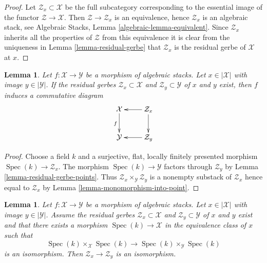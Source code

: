 \documentclass{stacks-project}
\theoremstyle{plain}
\newtheorem{lemma}[subsection]{Lemma}
\theoremstyle{definition}
\theoremstyle{remark}
\numberwithin{equation}{subsection}
\def\Spec{\mathop{\mathrm{Spec}}}
\begin{document}
\begin{proof}
Let $\mathcal{Z}_x \subset \mathcal{X}$ be the full subcategory corresponding
to the essential image of the functor $\mathcal{Z} \to \mathcal{X}$.
Then $\mathcal{Z} \to \mathcal{Z}_x$ is an equivalence, hence
$\mathcal{Z}_x$ is an algebraic stack, see
Algebraic Stacks, Lemma \ref{algebraic-lemma-equivalent}.
Since $\mathcal{Z}_x$ inherits all the properties of $\mathcal{Z}$ from
this equivalence it is clear from the uniqueness in
Lemma \ref{lemma-residual-gerbe}
that $\mathcal{Z}_x$ is the residual gerbe of $\mathcal{X}$ at $x$.
\end{proof}

\begin{lemma}
\label{lemma-residual-gerbe-functorial}
Let $f : \mathcal{X} \to \mathcal{Y}$ be a morphism of algebraic stacks.
Let $x \in |\mathcal{X}|$ with image $y \in |\mathcal{Y}|$.
If the residual gerbes $\mathcal{Z}_x \subset \mathcal{X}$
and $\mathcal{Z}_y \subset \mathcal{Y}$ of $x$ and $y$ exist,
then $f$ induces a commutative diagram
$$
\xymatrix{
\mathcal{X} \ar[d]_f & \mathcal{Z}_x \ar[l] \ar[d] \\
\mathcal{Y} & \mathcal{Z}_y \ar[l]
}
$$
\end{lemma}

\begin{proof}
Choose a field $k$ and a surjective, flat, locally finitely presented
morphism $\Spec(k) \to \mathcal{Z}_x$. The morphism
$\Spec(k) \to \mathcal{Y}$ factors through $\mathcal{Z}_y$ by
Lemma \ref{lemma-residual-gerbe-points}.
Thus $\mathcal{Z}_x \times_\mathcal{Y} \mathcal{Z}_y$
is a nonempty substack of $\mathcal{Z}_x$
hence equal to $\mathcal{Z}_x$ by Lemma \ref{lemma-monomorphism-into-point}.
\end{proof}

\begin{lemma}
\label{lemma-residual-gerbe-isomorphic}
Let $f : \mathcal{X} \to \mathcal{Y}$ be a morphism of algebraic stacks.
Let $x \in |\mathcal{X}|$ with image $y \in |\mathcal{Y}|$.
Assume the residual gerbes $\mathcal{Z}_x \subset \mathcal{X}$
and $\mathcal{Z}_y \subset \mathcal{Y}$ of $x$ and $y$ exist
and that there exists a morphism $\Spec(k) \to \mathcal{X}$
in the equivalence class of $x$ such that
$$
\Spec(k) \times_\mathcal{X} \Spec(k)
\longrightarrow
\Spec(k) \times_\mathcal{Y} \Spec(k)
$$
is an isomorphism. Then $\mathcal{Z}_x \to \mathcal{Z}_y$
is an isomorphism.
\end{lemma}
\end{document}
